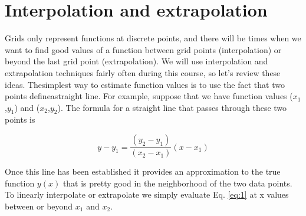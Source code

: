  		\section*{Interpolation and extrapolation}
     
    Grids only represent functions at discrete points, and there will be times when we want to find good values of a function between grid points (interpolation) or beyond the last grid point (extrapolation). We will use interpolation and extrapolation techniques fairly often during this course, so let\rq s review these ideas. Thesimplest way to estimate function values is to use the fact that two points defineastraight line. For example, suppose that we have function values ($x_1$,$y_1$) and ($x_2$,$y_2$). The formula for a straight line that passes through these two points is   
    
\begin{equation} \label{eq:1}
    y - y_1 = \frac{(y_2-y_1)}{(x_2-x_1)}(x-x_1) 
\end{equation}  
  
    Once this line has been established it provides an approximation to the true function $y(x)$ that is pretty good in the neighborhood of the two data points. To linearly interpolate or extrapolate we simply evaluate Eq. \ref{eq:1} at x values between or beyond $x_1$ and $x_2$.   
      
